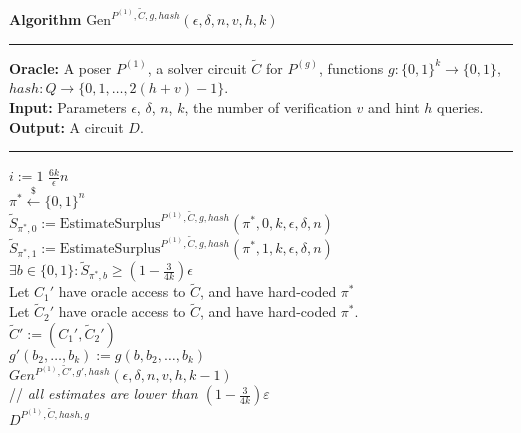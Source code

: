 %
%
\begin{codeblock}
  \textbf{Algorithm} $\text{Gen}^{P^{(1)}, \widetilde{C}, g, \mathit{hash}}(\epsilon, \delta, n, v, h, k)$
  \medskip \hrule \medskip
  \textbf{Oracle:} A poser $P^{(1)}$, a solver circuit $\widetilde{C}$ for $P^{(g)}$, functions $g: \{0,1\}^{k} \rightarrow \{0,1\}$, \\
  \IndII  $hash:Q \rightarrow \{0,1, \dots, 2(h + v) - 1\}$. \\
  \textbf{Input:}  Parameters $\epsilon$, $\delta$, $n$, $k$, the number of verification $v$ and hint $h$ queries.\\
  \textbf{Output:} A circuit $D$.
  \medskip\hrule\medskip
  \For $i:=1$ \To $\frac{6k}{\epsilon}n$ \Do \\
  \IndI $\pi^* \xleftarrow{\$} \{0,1\}^{n}$\\
  \IndI $\widetilde{S}_{\pi^*,0} := \text{EstimateSurplus}^{P^{(1)},  \widetilde{C}, g, hash}(\pi^*, 0, k, \epsilon, \delta,n)$\\
  \IndI $\widetilde{S}_{\pi^*,1} := \text{EstimateSurplus}^{P^{(1)},  \widetilde{C}, g, hash}(\pi^*, 1, k, \epsilon, \delta,n)$\\
  \IndI \If $ \exists b \in \{0,1\}: \widetilde{S}_{\pi^*,b} \geq (1 - \frac{3}{4k}) \epsilon$ \Then \\
  \IndII Let $C_1'$ have oracle access to $\widetilde{C}$, and have hard-coded $\pi^*$ \\
  \IndII Let $\widetilde{C}_2'$ have oracle access to $\widetilde{C}$, and have hard-coded $\pi^*$. \\
  \IndII $\widetilde{C}' := (C_1', \widetilde{C}_2')$ \\
  \IndII $g'(b_2, \dots, b_k) := g(b, b_2, \dots, b_k)$\\
  \IndII\Return $Gen^{P^{(1)}, \widetilde{C}', g', hash}(\epsilon, \delta, n, v, h, k-1)$ \\
  // \textit{all estimates are lower than $(1-\frac{3}{4k})\varepsilon$}\\
  \Return $D^{P^{(1)}, \widetilde{C}, hash, g}$
\end{codeblock}


